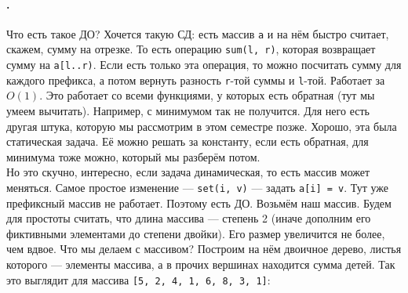 \documentclass{article}
\newcommand{\pseudo}{PseudoLexer.py:PseudoLexer -x}
\newcommand{\pseudocode}[1]{\texttt{#1}}
\begin{document}
    \paragraph{.}
    Что есть такое ДО? Хочется такую СД: есть массив \pseudocode{a} и на нём быстро считает, скажем, сумму на отрезке. То есть операцию \pseudocode{sum(l, r)}, которая возвращает сумму на \pseudocode{a[l..r)}. Если есть только эта операция, то можно посчитать сумму для каждого префикса, а потом вернуть разность \pseudocode{r}-той суммы и \pseudocode{l}-той. Работает за $O(1)$. Это работает со всеми функциями, у которых есть обратная (тут мы умеем вычитать). Например, с минимумом так не получится. Для него есть другая штука, которую мы рассмотрим в этом семестре позже. Хорошо, эта была статическая задача. Её можно решать за константу, если есть обратная, для минимума тоже можно, который мы разберём потом.\\
    Но это скучно, интересно, если задача динамическая, то есть массив может меняться. Самое простое изменение --- \pseudocode{set(i, v)} --- задать \pseudocode{a[i] = v}. Тут уже префиксный массив не работает. Поэтому есть ДО. Возьмём наш массив. Будем для простоты считать, что длина массива --- степень 2 (иначе дополним его фиктивными элементами до степени двойки). Его размер увеличится не более, чем вдвое. Что мы делаем с массивом? Построим на нём двоичное дерево, листья которого --- элементы массива, а в прочих вершинах находится сумма детей. Так это выглядит для массива \pseudocode{[5, 2, 4, 1, 6, 8, 3, 1]}:
    \begin{center}
    \end{center}
\end{document}
